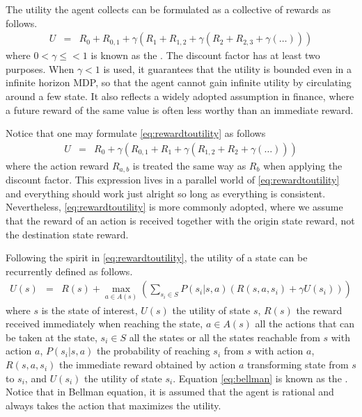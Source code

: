 The utility the agent collects can be formulated as a collective of rewards as follows.
\begin{eqnarray}
	U &=& R_0 + R_{0,1} + \gamma \left(R_1 + R_{1,2} + \gamma \left(R_2 + R_{2,3} + \gamma(\ldots)\right)\right) \label{eq:rewardtoutility}
\end{eqnarray}
where $0 < \gamma \leq <1$ is known as the . The discount factor has at least two purposes. When $\gamma < 1$ is used, it guarantees that the utility is bounded even in a infinite horizon MDP, so that the agent cannot gain infinite utility by circulating around a few state. It also reflects a widely adopted assumption in finance, where a future reward of the same value is often less worthy than an immediate reward.

Notice that one may formulate \eqref{eq:rewardtoutility} as follows
\begin{eqnarray}
	U &=& R_0 + \gamma \left(R_{0,1} + R_1 + \gamma \left(R_{1,2} + R_2 + \gamma(\ldots)\right)\right) \nonumber
\end{eqnarray}
where the action reward $R_{a,b}$ is treated the same way as $R_{b}$ when applying the discount factor. This expression lives in a parallel world of \eqref{eq:rewardtoutility} and everything should work just alright so long as everything is consistent. Nevertheless, \eqref{eq:rewardtoutility} is more commonly adopted, where we assume that the reward of an action is received together with the origin state reward, not the destination state reward.

Following the spirit in \eqref{eq:rewardtoutility}, the utility of a state can be recurrently defined as follows.
\begin{eqnarray}
	U(s) &=& R(s) + \max_{a\in A(s)}\left(\sum_{s_i \in S} P(s_i|s,a)\left(R(s,a,s_i) + \gamma U(s_i)\right)\right) \label{eq:bellman}
\end{eqnarray}
where $s$ is the state of interest, $U(s)$ the utility of state $s$, $R(s)$ the reward received immediately when reaching the state, $a\in A(s)$ all the actions that can be taken at the state, $s_i \in S$ all the states or all the states reachable from $s$ with action $a$, $P(s_i|s,a)$ the probability of reaching $s_i$ from $s$ with action $a$, $R(s,a,s_i)$ the immediate reward obtained by action $a$ transforming state from $s$ to $s_i$, and $U(s_i)$ the utility of state $s_i$. Equation \eqref{eq:bellman} is known as the . Notice that in Bellman equation, it is assumed that the agent is rational and always takes the action that maximizes the utility.

